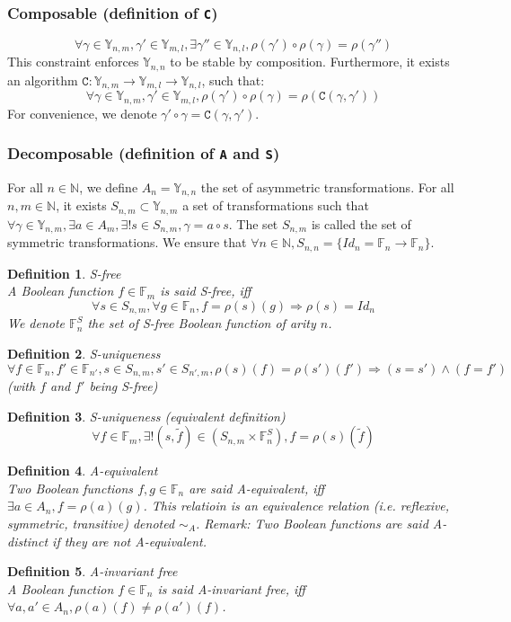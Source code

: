 \documentclass[a4paper,10pt]{article}
\newcommand{\N}{\mathbb{N}}%
\newcommand{\F}{\mathbb{F}}
\newcommand{\Y}{\mathbb{Y}}
\newtheorem{newdef}{Definition}
\newcommand{\definition}[2]{\begin{newdef}{#1\\}#2\end{newdef}}
\begin{document}
\subsubsection{Composable (definition of \texttt{C})}
\[\forall \gamma \in \Y_{n, m}, \gamma' \in \Y_{m, l}, \exists \gamma'' \in \Y_{n, l}, \rho(\gamma') \circ \rho(\gamma) = \rho(\gamma'')\]
This constraint enforces $\Y_{n, n}$ to be stable by composition.
Furthermore, it exists an algorithm $\mathtt{C} : \Y_{n, m} \rightarrow \Y_{m, l} \rightarrow \Y_{n, l}$, such that:
\[\forall \gamma \in \Y_{n, m}, \gamma' \in \Y_{m, l}, \rho(\gamma') \circ \rho(\gamma) = \rho(\mathtt{C}(\gamma, \gamma'))\]
For convenience, we denote $\gamma' \circ \gamma = \mathtt{C}(\gamma, \gamma')$.

\subsubsection{Decomposable (definition of \texttt{A} and \texttt{S})}

For all $n\in\N$, we define $A_n = \Y_{n, n}$ the set of asymmetric transformations.
For all $n, m\in\N$, it exists $S_{n, m} \subset \Y_{n, m}$ a set of transformations such that $\forall \gamma \in \Y_{n, m}, \exists a \in A_m, \exists! s \in S_{n, m},  \gamma = a \circ s$.
The set $S_{n, m}$ is called the set of symmetric transformations.
We ensure that $\forall n\in\N, S_{n, n} = \{ Id_n = \F_n \rightarrow \F_n \}$.

\definition{S-free}
{
A Boolean function $f\in\F_m$ is said S-free, iff
\[\forall s \in S_{n, m}, \forall g \in \F_n, f = \rho(s)(g) \Rightarrow \rho(s) = Id_n\]
We denote $\F^S_n$ the set of S-free Boolean function of arity $n$.
}

\definition{S-uniqueness}
{
\[\forall f\in\F_n, f'\in\F_{n'}, s\in S_{n, m}, s'\in S_{n', m}, \rho(s)(f) = \rho(s')(f') \Rightarrow (s = s') \land (f = f')\]
(with $f$ and $f'$ being S-free)
}

\definition{S-uniqueness (equivalent definition)}
{
\[\forall f\in\F_m, \exists! (s, \tilde{f})\in \left( S_{n, m} \times \F^S_n \right), f = \rho(s)(\tilde{f})\]
}

\definition{A-equivalent}
{
Two Boolean functions $f, g\in\F_n$ are said A-equivalent, iff $\exists a\in A_n, f = \rho(a)(g)$.
This relatioin is an equivalence relation (i.e. reflexive, symmetric, transitive) denoted $\sim_A$.
Remark: Two Boolean functions are said A-distinct if they are not A-equivalent.
}

\definition{A-invariant free}
{
A Boolean function $f\in\F_n$ is said A-invariant free, iff $\forall a, a'\in A_n, \rho(a)(f) \neq \rho(a')(f)$.
}
\end{document}
